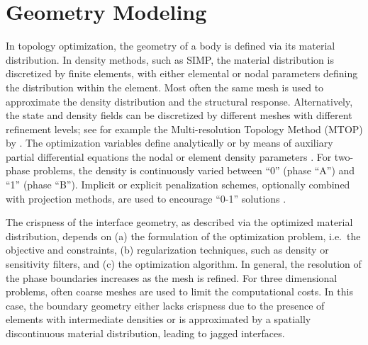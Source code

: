 \section{Geometry Modeling}
\label{sec:geometry-modeling}

In topology optimization, the geometry of a body is defined via its material distribution. In density methods, such as SIMP, the material distribution is discretized by finite elements, with either elemental or nodal parameters defining the distribution within the element. Most often the same mesh is used to approximate the density distribution and the structural response. Alternatively, the state and density fields can be discretized by different meshes with different refinement levels; see for example the Multi-resolution Topology Method (MTOP) by \citet{NSP:10}. The optimization variables define analytically or by means of auxiliary partial differential equations the nodal or element density parameters \citep{SM:13}. For two-phase problems, the density is continuously varied between ``0'' (phase ``A'') and ``1'' (phase ``B''). Implicit or explicit penalization schemes, optionally combined with projection methods, are used to encourage ``0-1'' solutions \citep{GPB:04,Sigmund:07}.

The crispness of the interface geometry, as described via the optimized material distribution, depends on (a) the formulation of the optimization problem, i.e.~the objective and constraints, (b) regularization techniques, such as density or sensitivity filters, and (c) the optimization algorithm. In general, the resolution of the phase boundaries increases as the mesh is refined. For three dimensional problems, often coarse meshes are used to limit the computational costs. In this case, the boundary geometry either lacks crispness due to the presence of elements with intermediate densities or is approximated by a spatially discontinuous material distribution, leading to jagged interfaces.

